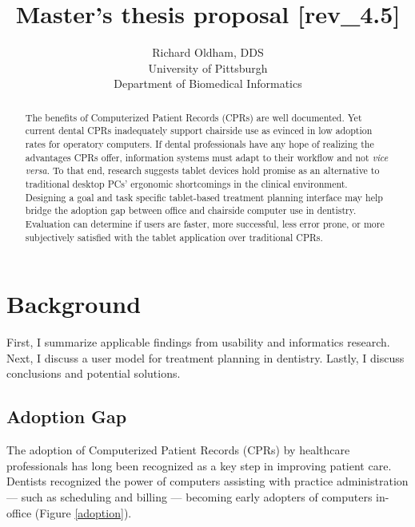 \documentclass[11pt]{article}
\begin{document}
\title{Master's thesis proposal [rev\_4.5]} %
\author{\normalsize Richard Oldham, DDS \vspace{7pt} \\ 
		\small University of Pittsburgh \vspace{-2pt} \\
		\small Department of Biomedical Informatics}
\maketitle

\begin{abstract}
The benefits of Computerized Patient Records (CPRs) are well documented. Yet current dental CPRs inadequately support chairside use as evinced in low adoption rates for operatory computers. If dental professionals have any hope of realizing the advantages CPRs offer, information systems must adapt to their workflow and not \textit{vice versa}. To that end, research suggests tablet devices hold promise as an alternative to traditional desktop PCs' ergonomic shortcomings in the clinical environment. Designing a goal and task specific tablet-based treatment planning interface may help bridge the adoption gap between office and chairside computer use in dentistry. Evaluation can determine if users are faster, more successful, less error prone, or more subjectively satisfied with the tablet application over traditional CPRs.
\end{abstract}

\setcounter{tocdepth}{4}
\tableofcontents
\listoftables
\newpage

\section{Background}
First, I summarize applicable findings from usability and informatics research. Next, I discuss a user model for treatment planning in dentistry. Lastly, I discuss conclusions and potential solutions.

\subsection{Adoption Gap}

The adoption of Computerized Patient Records (CPRs) by healthcare professionals has long been recognized as a key step in improving patient care\cite{Chasteen1992A-computer-data,Eisne1993The-computer-ba,Thompson2004The-Decade-of-H,Spicer2008Bytes-and-bites,Schleyer2011Advancing-oral}. Dentists recognized the power of computers assisting with practice administration --- such as scheduling and billing --- becoming early adopters of computers in-office (Figure \ref{adoption})\cite{Schleyer2006Clinical-Comput}.
\end{document}
